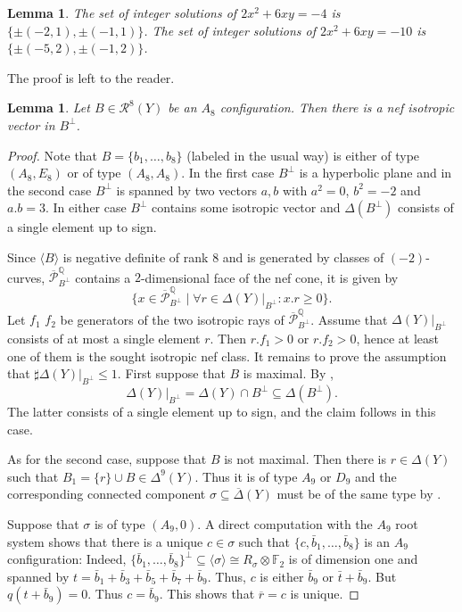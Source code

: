 \documentclass[a4paper]{amsart}
\theoremstyle{definition}
\theoremstyle{plain}
\newtheorem{lemma}[definition]{Lemma}
\newcommand{\FF}{\mathbb{F}}
\renewcommand{\P}{\mathcal{P}}
\newcommand{\R}{\mathcal{R}}
\newcommand{\Pbar}{\overline{\P}^\mathbb{Q}}
\newcommand{\DeltabarY}{\overline{\Delta}(Y)}
\begin{document}
\begin{lemma}\label{lem:quadratic_eqn}
The set of integer solutions of $2x^2+6xy=-4$ is $\{\pm (-2,1), \pm (-1,1)\}$.
The set of integer solutions of $2x^2+6xy=-10$ is $\{\pm(-5,2),\pm(-1,2)\}$.
\end{lemma}
The proof is left to the reader.

\begin{lemma}\label{lem:A8_nef_isotropic}
Let $B \in \R^8(Y)$ be an $A_8$ configuration. Then there is a nef isotropic vector in $B^\perp$.
\end{lemma}
\begin{proof}
Note that $B=\{b_1,\dots,b_8\}$ (labeled in the usual way) is either of type $(A_8,E_8)$ or of type $(A_8,A_8)$. In the first case $B^\perp$ is a hyperbolic plane and in the second case $B^\perp$ is spanned by two vectors $a,b$ with $a^2=0$, $b^2=-2$ and $a.b=3$.
In either case $B^\perp$ contains some isotropic vector and $\Delta(B^\perp)$ consists of a single element up to sign.

Since $\langle B \rangle$ is negative definite of rank $8$ and is generated by classes of $(-2)$-curves, $\Pbar_{B^\perp}$ contains a $2$-dimensional face of the nef cone, it is given by 
\[\{x \in \Pbar_{B^\perp} \mid \forall r \in \Delta(Y)|_{B^\perp}\colon x.r \geq 0\}.\] 
Let $f_1$ $f_2$ be generators of the two isotropic rays of $\Pbar_{B^\perp}$. Assume that $\Delta(Y)|_{B^\perp}$ consists of at most a single element $r$. Then $r.f_1>0$ or $r.f_2>0$, hence at least one of them is the sought  isotropic nef class. 
It remains to prove the assumption that $\sharp \Delta(Y)|_{B^\perp} \leq 1$.
First suppose that $B$ is maximal. By ,
\[\Delta(Y)|_{B^\perp}=\Delta(Y) \cap B^\perp \subseteq \Delta(B^\perp).\] 
The latter consists of a single element up to sign, and the claim follows in this case. 

As for the second case, suppose that $B$ is not maximal. Then there is $r \in \Delta(Y)$ such that $B_1 =\{r\} \cup B\in \Delta^9(Y)$. Thus it is of type $A_9$ or $D_9$ and the corresponding connected component $\sigma \subseteq \DeltabarY$ must be of the same type by .

Suppose that $\sigma$ is of type $(A_9, 0)$.
A direct computation with the $A_9$ root system shows that there is a unique $c \in \sigma$ such that $\{c,\bar b_1,\dots,\bar b_8\}$ is an $A_9$ configuration: Indeed, $\{\bar b_1,\dots,\bar b_8\}^\perp\subseteq \langle \sigma \rangle \cong R_\sigma \otimes \FF_2$ is of dimension one and spanned by $t = \bar b_1+\bar b_3+\bar b_5+\bar b_7+\bar b_9$. Thus, $c$ is either $\bar b_9$ or $\bar t+ \bar b_9$. But $q(t+\bar b_9)=0$. Thus $c=\bar b_9$.
This shows that $\overline{r}=c$ is unique. 


\end{proof}
\end{document}
